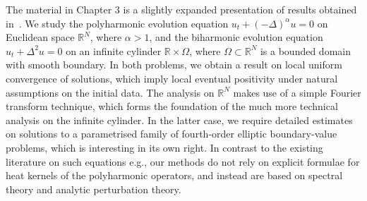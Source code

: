\documentclass{baustms}
\theoremstyle{cupthm}
\theoremstyle{cupdefn}
\theoremstyle{cuprem}
\numberwithin{equation}{section}
\begin{document}
The material in Chapter 3 is a slightly expanded presentation of results obtained in~\cite{DGM}. We study the polyharmonic evolution equation $u_t + (-\Delta)^\alpha u = 0$ on Euclidean space $\mathbb{R}^N$, where $\alpha>1$, and the biharmonic evolution equation $u_t + \Delta^2 u = 0$ on an infinite cylinder $\mathbb{R}\times\Omega$, where $\Omega\subset\mathbb{R}^N$ is a bounded domain with smooth boundary. In both problems, we obtain a result on local uniform convergence of solutions, which imply local eventual positivity under natural assumptions on the initial data. The analysis on $\mathbb{R}^N$ makes use of a simple Fourier transform technique, which forms the foundation of the much more technical analysis on the infinite cylinder. In the latter case, we require detailed estimates on solutions to a parametrised family of fourth-order elliptic boundary-value problems, which is interesting in its own right. In contrast to the existing literature on such equations e.g.\cite{GG-lep, FGG, FF-lep}, our methods do not rely on explicit formulae for heat kernels of the polyharmonic operators, and instead are based on spectral theory and analytic perturbation theory.

\end{document}
